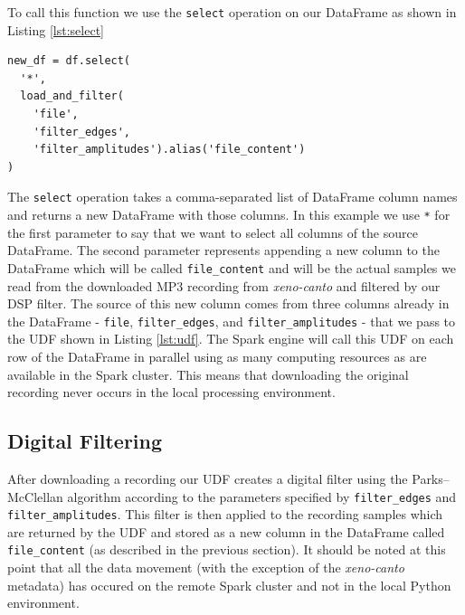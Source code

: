 \documentclass[conference,twoside]{IEEEtran}
\newcommand{\code}[1]{\texttt{#1}}
\begin{document}
To call this function we use the \code{select} operation on our DataFrame as shown in Listing \ref{lst:select}
\begin{lstlisting}[language=Txt, caption={PySpark DataFrame Select()}, label={lst:select}]
new_df = df.select(
  '*',
  load_and_filter(
    'file',
    'filter_edges',
    'filter_amplitudes').alias('file_content')
)
\end{lstlisting}
The \code{select} operation takes a comma-separated list of DataFrame column names and returns a new DataFrame with those columns. In this example we use \code{*} for the first parameter to say that we want to select all columns of the source DataFrame. The second parameter represents appending a new column to the DataFrame which will be called \code{file\_content} and will be the actual samples we read from the downloaded MP3 recording from \textit{xeno-canto} and filtered by our DSP filter. The source of this new column comes from three columns already in the DataFrame - \code{file}, \code{filter\_edges}, and \code{filter\_amplitudes} - that we pass to the UDF shown in Listing \ref{lst:udf}. The Spark engine will call this UDF on each row of the DataFrame in parallel using as many computing resources as are available in the Spark cluster. This means that downloading the original recording never occurs in the local processing environment.

\subsection{Digital Filtering}
After downloading a recording our UDF creates a digital filter using the Parks–McClellan algorithm\cite{dsp} according to the parameters specified by \code{filter\_edges} and \code{filter\_amplitudes}. This filter is then applied to the recording samples which are returned by the UDF and stored as a new column in the DataFrame called \code{file\_content} (as described in the previous section). It should be noted at this point that all the data movement (with the exception of the \textit{xeno-canto} metadata) has occured on the remote Spark cluster and not in the local Python environment.
\end{document}
